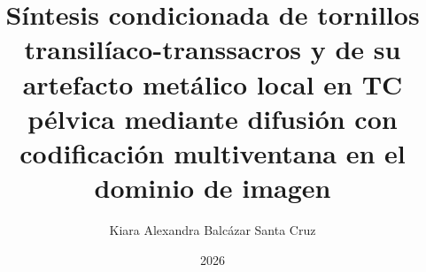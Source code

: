\documentclass[a4paper,12pt,oneside]{tesisutec}
\newcommand{\resumengaps}{%
  }
\begin{document}
\frontmatter



\title{Síntesis condicionada de tornillos transilíaco-transsacros y de su artefacto metálico local en TC pélvica mediante difusión con codificación multiventana en el dominio de imagen}

\author{Kiara Alexandra Balcázar Santa Cruz } %
\date{2026}

\maketitle


\resumengaps





\tableofcontents

\newpage

\listoftables

\newpage

\listoffigures


\mainmatter
\pagestyle{fancy}


 

\renewcommand{\bibname}{\hfill\Large\bf{REFERENCIAS BIBLIOGRÁFICAS}\hfill}




\end{document}
